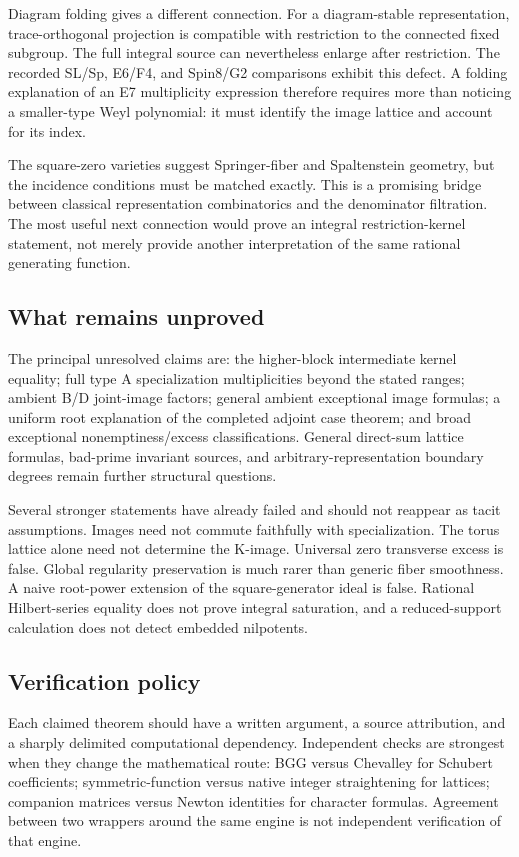 Diagram folding gives a different connection. For a diagram-stable representation, trace-orthogonal projection is compatible with restriction to the connected fixed subgroup. The full integral source can nevertheless enlarge after restriction. The recorded SL/Sp, E6/F4, and Spin8/G2 comparisons exhibit this defect. A folding explanation of an E7 multiplicity expression therefore requires more than noticing a smaller-type Weyl polynomial: it must identify the image lattice and account for its index.

The square-zero varieties suggest Springer-fiber and Spaltenstein geometry, but the incidence conditions must be matched exactly. This is a promising bridge between classical representation combinatorics and the denominator filtration. The most useful next connection would prove an integral restriction-kernel statement, not merely provide another interpretation of the same rational generating function.

\subsection{What remains unproved}
The principal unresolved claims are: the higher-block intermediate kernel equality; full type A specialization multiplicities beyond the stated ranges; ambient B/D joint-image factors; general ambient exceptional image formulas; a uniform root explanation of the completed adjoint case theorem; and broad exceptional nonemptiness/excess classifications. General direct-sum lattice formulas, bad-prime invariant sources, and arbitrary-representation boundary degrees remain further structural questions.

Several stronger statements have already failed and should not reappear as tacit assumptions. Images need not commute faithfully with specialization. The torus lattice alone need not determine the K-image. Universal zero transverse excess is false. Global regularity preservation is much rarer than generic fiber smoothness. A naive root-power extension of the square-generator ideal is false. Rational Hilbert-series equality does not prove integral saturation, and a reduced-support calculation does not detect embedded nilpotents.

\subsection{Verification policy}
Each claimed theorem should have a written argument, a source attribution, and a sharply delimited computational dependency. Independent checks are strongest when they change the mathematical route: BGG versus Chevalley for Schubert coefficients; symmetric-function versus native integer straightening for lattices; companion matrices versus Newton identities for character formulas. Agreement between two wrappers around the same engine is not independent verification of that engine.

